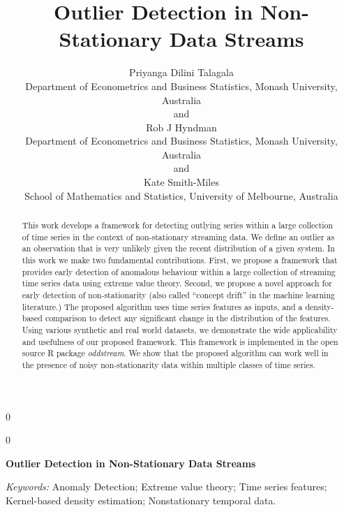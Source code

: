 \documentclass[12pt]{article}
\newcommand{\blind}{0}
\begin{document}
\def\spacingset#1{\renewcommand{\baselinestretch}%
{#1}\small\normalsize} \spacingset{1}



\blind
{
  \title{\bf Outlier Detection in Non-Stationary Data Streams}

  \author{
        Priyanga Dilini Talagala \\
    Department of Econometrics and Business Statistics, Monash University,
    Australia\\
     and \\     Rob J Hyndman \\
    Department of Econometrics and Business Statistics, Monash University,
    Australia\\
     and \\     Kate Smith-Miles \\
    School of Mathematics and Statistics, University of Melbourne, Australia\\
      }
  \maketitle
} \fi

\blind
{
  \bigskip
  \bigskip
  \bigskip
  \begin{center}
    {\LARGE\bf Outlier Detection in Non-Stationary Data Streams}
  \end{center}
  \medskip
} \fi

\bigskip
\begin{abstract}
This work develops a framework for detecting outlying series within a
large collection of time series in the context of non-stationary
streaming data. We define an outlier as an observation that is very
unlikely given the recent distribution of a given system. In this work
we make two fundamental contributions. First, we propose a framework
that provides early detection of anomalous behaviour within a large
collection of streaming time series data using extreme value theory.
Second, we propose a novel approach for early detection of
non-stationarity (also called ``concept drift'' in the machine learning
literature.) The proposed algorithm uses time series features as inputs,
and a density-based comparison to detect any significant change in the
distribution of the features. Using various synthetic and real world
datasets, we demonstrate the wide applicability and usefulness of our
proposed framework. This framework is implemented in the open source R
package \emph{oddstream}. We show that the proposed algorithm can work
well in the presence of noisy non-stationarity data within multiple
classes of time series.
\end{abstract}

\noindent%
{\it Keywords:} Anomaly Detection; Extreme value theory; Time series features;
Kernel-based density estimation; Nonstationary temporal data.
\vfill

\newpage
\spacingset{1.45} %





\end{document}
